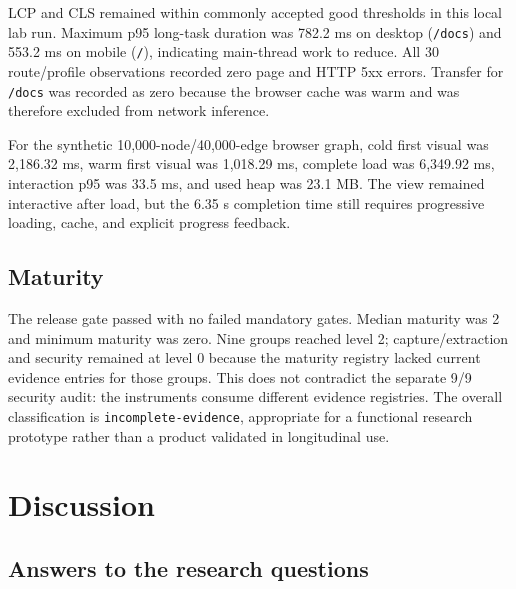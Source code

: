 \documentclass{sbc2023}
\newcommand{\code}[1]{\texttt{#1}}
\begin{document}
LCP and CLS remained within commonly accepted good thresholds in this local lab run. Maximum p95
long-task duration was 782.2 ms on desktop (\code{/docs}) and 553.2 ms on mobile (\code{/}),
indicating main-thread work to reduce. All 30 route/profile observations recorded zero page and
HTTP 5xx errors. Transfer for \code{/docs} was recorded as zero because the browser cache was warm
and was therefore excluded from network inference.

For the synthetic 10,000-node/40,000-edge browser graph, cold first visual was 2,186.32 ms, warm
first visual was 1,018.29 ms, complete load was 6,349.92 ms, interaction p95 was 33.5 ms, and used
heap was 23.1 MB. The view remained interactive after load, but the 6.35 s completion time still
requires progressive loading, cache, and explicit progress feedback.

\FloatBarrier
\subsection{Maturity}

The release gate passed with no failed mandatory gates. Median maturity was 2 and minimum maturity
was zero. Nine groups reached level 2; capture/extraction and security remained at level 0 because
the maturity registry lacked current evidence entries for those groups. This does not contradict
the separate 9/9 security audit: the instruments consume different evidence registries. The
overall classification is \code{incomplete-evidence}, appropriate for a functional research
prototype rather than a product validated in longitudinal use.

\section{Discussion}
\label{sec:discussion}

\subsection{Answers to the research questions}
\end{document}
